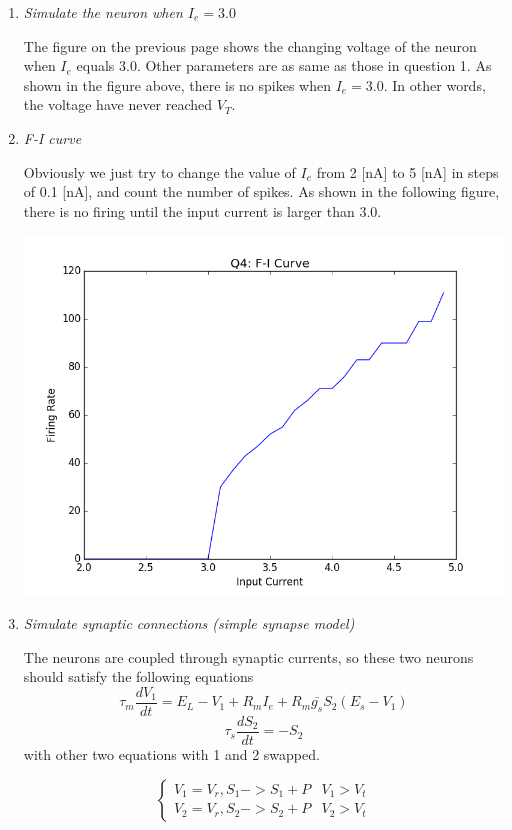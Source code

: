 \documentclass[12pt]{article}
\begin{document}
\begin{enumerate}
    \item \textit{Simulate the neuron when $I_e=3.0$}
    
	The figure on the previous page shows the changing voltage of the neuron when $I_e$ equals 3.0. Other parameters are as same as those in question 1. As shown in the figure above, there is no spikes when $I_e=3.0$. In other words, the voltage have never reached $V_T$.
    
    \item \textit{F-I curve}
    
    Obviously we just try to change the value of $I_e$ from 2 [nA] to 5 [nA] in steps of 0.1 [nA], and count the number of spikes. As shown in the following figure, there is no firing until the input current is larger than 3.0.
    \begin{center}
    	\includegraphics[width=0.5\linewidth]{figure_q4.png}
	\end{center}
    
    \item \textit{Simulate synaptic connections (simple synapse model) }
    
    The neurons are coupled through synaptic currents, so these two neurons should satisfy the following equations
    \begin{equation}
    	\tau_m\frac{dV_1}{dt}=E_L-V_1+R_mI_e+R_m\bar{g_s}S_2(E_s-V_1)
    \end{equation}
    \begin{equation}
    	\tau_s\frac{dS_2}{dt}=-S_2
    \end{equation}
    with other two equations with 1 and 2 swapped. 
    
    $$
    \begin{cases}
    V_1=V_r, S_1->S_1+P & V_1>V_t\\
    V_2=V_r, S_2->S_2+P & V_2>V_t
    \end{cases}
    $$
    

\end{enumerate}
\end{document}
